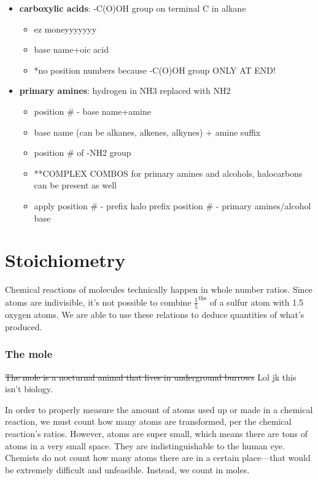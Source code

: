 \documentclass[letterpaper, 12pt]{article}
\begin{document}
\begin{itemize}
\begin{itemize}
		\end{itemize}
		\item \textbf{carboxylic acids}: -C(O)OH group on terminal C in alkane
		\begin{itemize}
			\item ez moneyyyyyyy
			\item base name+oic acid
			\item *no position numbers because -C(O)OH group ONLY AT END! 
		\end{itemize}
		\item \textbf{primary amines}: hydrogen in NH3 replaced with NH2
		\begin{itemize}
			\item position \# - base name+amine
			\item base name (can be alkanes, alkenes, alkynes) + amine suffix 
			\item position \# of -NH2 group
			\item **COMPLEX COMBOS for primary amines and alcohols, halocarbons can be present as well
			\item apply position \# - prefix halo prefix position \# - primary amines/alcohol base
		\end{itemize}
	\end{itemize}

	
	

\clearpage

\part{Stoichiometry}
Chemical reactions of molecules technically happen in whole number ratios. Since atoms are indivisible, it's not possible to combine $\frac{1}{5}^{\text{ths}}$ of a sulfur atom with 1.5 oxygen atoms. We are able to use these relations to deduce quantities of what's produced.

\section{The mole}
\st{The mole is a nocturnal animal that lives in underground burrows} Lol jk this isn't biology.

In order to properly measure the amount of atoms used up or made in a chemical reaction, we must count how many atoms are transformed, per the chemical reaction's ratios. However, atoms are super small, which means there are tons of atoms in a very small space. They are indistinguishable to the human eye. Chemists do not count how many atoms there are in a certain place---that would be extremely difficult and unfeasible. Instead, we count in moles.
\end{document}
